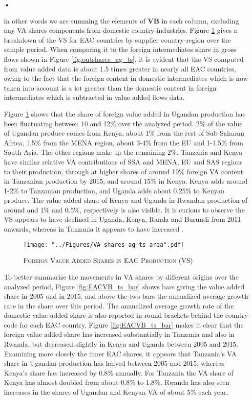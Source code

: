 \textbf{\textbf{•}}\documentclass[a4paper]{article}
\begin{document}
in other words we are summing the elements of \textbf{VB} in each column, excluding any VA shares components from domestic country-industries. Figure \ref{fig:EACVB_ts} gives a breakdown of the VS for EAC countries by supplier country-region over the sample period. When comparing it to the foreign intermediates share in gross flows shown in Figure \ref{fig:outshares_ag_ts}, it is evident that the VS computed from value added data is about 1.5 times greater in nearly all EAC countries, owing to the fact that the foreign content in domestic intermediates which is now taken into account is a lot greater than the domestic content in foreign intermediates which is subtracted in value added flows data. \newline

Figure \ref{fig:EACVB_ts} shows that the share of foreign value added in Ugandan production has been fluctuating between 10 and 12\% over the analyzed period. 2\% of the value of Ugandan produce comes from Kenya, about 1\% from the rest of Sub-Saharan Africa, 1.5\% from the MENA region, about 3-4\% from the EU and 1-1.5\% from South Asia. The other regions make up the remaining 2\%. Tanzania and Kenya have similar relative VA contributions of SSA and MENA, EU and SAS regions to their production, through at higher shares of around 19\% foreign VA content in Tanzanian production by 2015, and around 15\% in Kenya. Kenya adds around 1-2\% to Tanzanian production, and Uganda adds about 0.25\% to Kenyan produce. The value added share of Kenya and Uganda in Rwandan production of around and 1\% and 0.5\%, respectively is also visible. It is curious to observe the VS appears to have declined in Uganda, Kenya, Randa and Burundi from 2011 onwards, whereas in Tanzania it appears to have increased .

\begin{figure}[h!]
\centering
\caption{\label{fig:EACVB_ts}\textsc{Foreign Value Added Shares in EAC Production (VS)}}
\texttt{[image: "../Figures/VA\_shares\_ag\_ts\_area".pdf]} %
\end{figure}
\FloatBarrier

To better summarize the movements in VA shares by different origins over the analyzed period, Figure \ref{fig:EACVB_ts_bar} shows  bars giving the value added share in 2005 and in 2015, and above the two bars the annualized average growth rate in the share over this period. The annualized average growth rate of the domestic value added share is also reported in round brackets behind the country code for each EAC country. Figure \ref{fig:EACVB_ts_bar} makes it clear that the foreign value added share has increased substantially in Tanzania and also in Rwanda, but decreased slightly in Kenya and Uganda between 2005 and 2015.  Examining more closely the inner EAC shares, it appears that Tanzania's VA share in Ugandan production has halved between 2005 and 2015, whereas Kenya's share has increased by 0.8\% annually. For Tanzania the VA share of Kenya has almost doubled from about 0.8\% to 1.8\%. Rwanda has also seen increases in the shares of Ugandan and Kenyan VA of about 5\% each year. 
\end{document}
